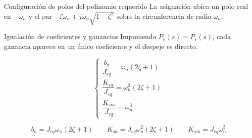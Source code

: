 \documentclass[aspectratio=169,t]{beamer}
\begin{document}
\begin{frame}{Configuración de polos del polinomio requerido}
{\small\color{uncGray}La asignación ubica un polo real en $-\omega_n$ y el par $-\zeta\omega_n\pm j\omega_n\sqrt{1-\zeta^2}$ sobre la circunferencia de radio $\omega_n$.}\par
\vspace{1mm}
\centering
{}
\end{frame}

\begin{frame}{Igualación de coeficientes y ganancias}
{\small\color{uncGray}Imponiendo $P_e(s)=P_r(s)$, cada ganancia aparece en un único coeficiente y el despeje es directo.}\par
\vspace{4mm}

\begin{equation*}
\begin{cases}
\dfrac{b_a}{J_{eq}}=\omega_n(2\zeta+1)\\[8pt]
\dfrac{K_{sa}}{J_{eq}}=\omega_n^2(2\zeta+1)\\[8pt]
\dfrac{K_{sia}}{J_{eq}}=\omega_n^3
\end{cases}
\end{equation*}

\begin{equation*}
\boxed{b_a=J_{eq}\omega_n(2\zeta+1)}\qquad
\boxed{K_{sa}=J_{eq}\omega_n^2(2\zeta+1)}\qquad
\boxed{K_{sia}=J_{eq}\omega_n^3}
\end{equation*}
\end{frame}
\end{document}
